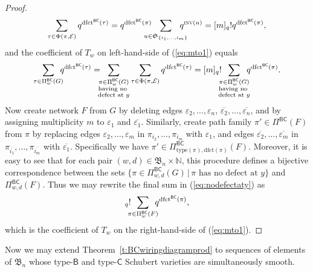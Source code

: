 \documentclass[12pt]{amsart}
\theoremstyle{definition}
\numberwithin{equation}{section}
\newcommand{\mfs}[1]{\mathfrak{S}_{#1}}
\newcommand{\bn}{\mathfrak{B}_n}
\newcommand{\ol}[1]{\overline{#1}}
\newcommand{\sumsb}[1]{\sum_{\substack{#1}}}  %
\newcommand{\inv}{\textsc{inv}}
\newcommand{\dfct}{\mathrm{dfct}}
\newcommand{\type}{\mathrm{type}}
\newcommand{\nTksp}{\negthickspace\negthickspace}
\newcommand{\PiBC}{\Pi^{\msfBC}}
\newcommand{\msfBB}{\mathsf{B}}
\newcommand{\msfC}{\mathsf{C}}
\newcommand{\msfBC}{\mathsf{BC}}
\begin{document}
\begin{proof}
 \begin{equation}\label{eq:mqfactorial}
     \sum_{\tau \in \Phi(\pi,\mathcal E)} q^{\dfct^{\msfBC}(\tau)} = q^{\dfct^{\msfBC}(\pi)}\nTksp\nTksp
     \sum_{u \in \mfs{\{i_1,\dotsc,i_m\}}} \nTksp \nTksp q^{\inv(u)}
     = 
     [m]_q! q^{\dfct^{\msfBC}(\pi)},
 \end{equation}
 and the coefficient of $T_w$ on left-hand-side of (\ref{eq:mto1}) equals
 \begin{equation}\label{eq:nodefectaty}
     \sum_{\tau \in \PiBC_w(G)}\nTksp q^{\dfct^{\msfBC}(\tau)} =
     \nTksp\sumsb{\pi \in \PiBC_w(G)\\
     \text{having no }\\\text{defect at } y}
     \sum_{\tau \in \Phi(\pi,\mathcal E)} q^{\dfct^{\msfBC}(\tau)}
     = [m]_q! 
     \nTksp\sumsb{\pi \in \PiBC_w(G)\\ 
     \text{having no }\\\text{defect at } y}\nTksp 
     q^{\dfct^{\msfBC}(\pi)}.
 \end{equation}
 Now create network $F$ from $G$ by deleting edges $\varepsilon_2,\dotsc,\varepsilon_n$, $\ol{\varepsilon_2},\dotsc,\ol{\varepsilon_n}$, and by assigning multiplicity $m$ to $\varepsilon_1$ and $\ol{\varepsilon_1}$. 
 Similarly, create path family $\pi' \in \PiBC(F)$ from $\pi$ by replacing edges $\varepsilon_2,\dotsc,\varepsilon_m$ in $\pi_{i_2},\dotsc,\pi_{i_m}$
 with $\varepsilon_1$, and edges $\ol{\varepsilon_2},\dotsc,\ol{\varepsilon_m}$ 
 in $\pi_{\ol{i_1}},\dotsc,\pi_{\ol{i_m}}$
 with $\ol{\varepsilon_1}$. Specifically we have $\pi' \in \PiBC_{\type(\pi),\dfct(\pi)}(F)$. Moreover, it is easy to see that for each pair $(w,d) \in \bn \times \mathbb N$, this procedure defines a bijective correspondence between the sets
 $\{ \pi \in \PiBC_{w,d}(G) \,|\, \pi \text{ has no defect at } y \}$ and $\PiBC_{w,d}(F)$. Thus we may rewrite the final sum in (\ref{eq:nodefectaty}) as
\begin{equation*}
    [m]_q! \nTksp\sum_{\pi \in \PiBC_w(F)}\nTksp q^{\dfct^{\msfBC}(\pi)},
\end{equation*}
which is the coefficient of $T_w$ on the right-hand-side of (\ref{eq:mto1}).
\end{proof}

Now we may extend Theorem~\ref{t:BCwiringdiagramprod} to sequences of elements of $\bn$ whose type-$\msfBB$ and type-$\msfC$ Schubert varieties are simultaneously smooth.
\end{document}
